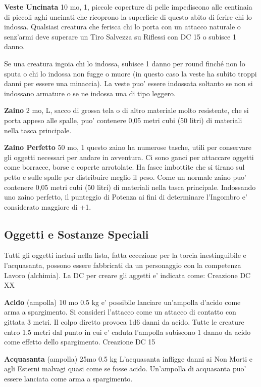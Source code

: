 \documentclass[a4paper,11pt,twoside,openany]{book}
\begin{document}
{\textbf{Veste Uncinata} 10 mo, 1, piccole coperture di pelle impediscono alle centinaia di piccoli aghi uncinati che ricoprono la superficie di questo abito di ferire chi lo indossa. Qualsiasi creatura che ferisca chi lo porta con un attacco naturale o senz'armi deve superare un Tiro Salvezza su Riflessi con DC 15 o subisce 1 danno.

Se una creatura ingoia chi lo indossa, subisce 1 danno per round finché non lo sputa o chi lo indossa non fugge o muore (in questo caso la veste ha subito troppi danni per essere una minaccia). La veste puo' essere indossata soltanto se non si indossano armature o se ne indossa una di tipo leggero.

\textbf{Zaino} 2 mo, L, sacco di grossa tela o di altro materiale molto resistente, che si porta appeso alle spalle, puo' contenere 0,05 metri cubi (50 litri) di materiali nella tasca principale. 

\textbf{Zaino Perfetto} 50 mo, 1 questo zaino ha numerose tasche, utili per conservare gli oggetti necessari per andare in avventura. Ci sono ganci per attaccare oggetti come borracce, borse e coperte arrotolate.
Ha fasce imbottite che si tirano sul petto e sulle spalle per distribuire meglio il peso. Come un normale zaino puo' contenere 0,05 metri cubi (50 litri) di materiali nella tasca principale. Indossando uno zaino perfetto, il punteggio di Potenza ai fini di determinare l'Ingombro e' considerato maggiore di +1.

\subsection{Oggetti e Sostanze Speciali}

\label{oggetti-e-sostanze-speciali}

Tutti gli oggetti inclusi nella lista, fatta eccezione per la torcia inestinguibile e l'acquasanta, possono essere fabbricati da un personaggio con la competenza Lavoro (alchimia). La DC per creare gli aggetti e' indicata come: Creazione DC XX

\textbf{Acido} (ampolla) 10 mo 0.5 kg e' possibile lanciare un'ampolla d'acido come arma a spargimento. Si consideri l'attacco come un attacco di contatto con gittata 3 metri. Il colpo diretto provoca 1d6 danni da acido. Tutte le creature entro 1,5 metri dal punto in cui e' caduta l'ampolla subiscono 1 danno da acido come effetto dello spargimento.
Creazione DC 15

\textbf{Acquasanta} (ampolla) 25mo 0.5 kg L'acquasanta infligge danni ai Non Morti e agli Esterni malvagi quasi come se fosse acido. Un'ampolla di acquasanta puo' essere lanciata come arma a spargimento.

}
\end{document}
